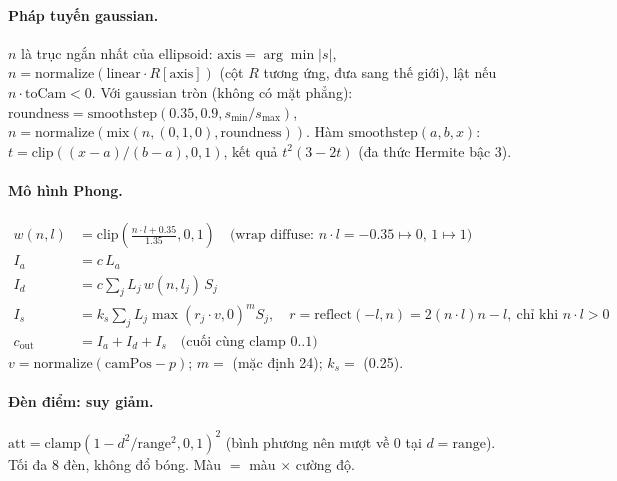 \paragraph{Pháp tuyến gaussian.}
$n$ là trục ngắn nhất của ellipsoid: $\mathrm{axis}=\arg\min|s|$, $n=\mathrm{normalize}(\mathrm{linear}\cdot R[\mathrm{axis}])$ (cột $R$ tương ứng, đưa sang thế giới), lật nếu $n\cdot\mathrm{toCam}<0$. Với gaussian tròn (không có mặt phẳng): $\mathrm{roundness}=\mathrm{smoothstep}(0.35,0.9,s_{\min}/s_{\max})$, $n=\mathrm{normalize}(\mathrm{mix}(n,(0,1,0),\mathrm{roundness}))$. Hàm $\mathrm{smoothstep}(a,b,x)$: $t=\mathrm{clip}((x-a)/(b-a),0,1)$, kết quả $t^2(3-2t)$ (đa thức Hermite bậc 3).

\paragraph{Mô hình Phong.}
\begin{align*}
w(n,l)&=\mathrm{clip}\!\left(\frac{n\cdot l+0.35}{1.35},0,1\right)\quad\text{(wrap diffuse: $n\cdot l=-0.35\mapsto0$, $1\mapsto1$)}\\
I_a&=c\,L_a\\
I_d&=c\sum_j L_j\,w(n,l_j)\,S_j\\
I_s&=k_s\sum_j L_j\max(r_j\cdot v,0)^m S_j,\quad r=\mathrm{reflect}(-l,n)=2(n\cdot l)n-l,\ \text{chỉ khi }n\cdot l>0\\
c_{\mathrm{out}}&=I_a+I_d+I_s\quad\text{(cuối cùng clamp 0..1)}
\end{align*}
$v=\mathrm{normalize}(\mathrm{camPos}-p)$; $m=$  (mặc định 24); $k_s=$  (0.25).

\paragraph{Đèn điểm: suy giảm.}
$\mathrm{att}=\mathrm{clamp}(1-d^2/\mathrm{range}^2,0,1)^2$ (bình phương nên mượt về 0 tại $d=\mathrm{range}$). Tối đa 8 đèn, không đổ bóng. Màu $=$ màu $\times$ cường độ.

